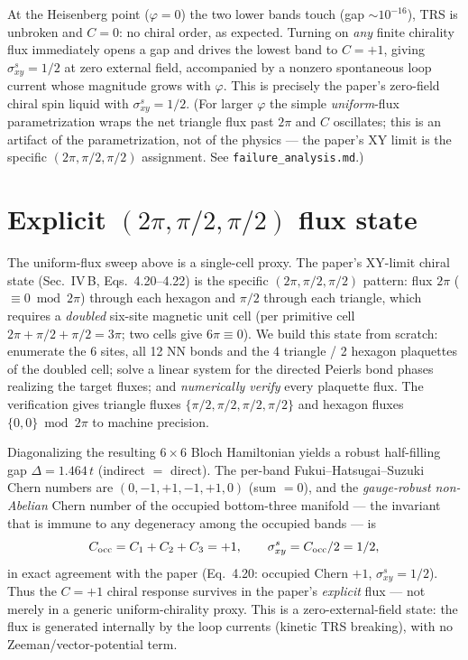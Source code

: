 \documentclass[aps,prb,twocolumn,superscriptaddress,nofootinbib]{revtex4-2}
\begin{document}
At the Heisenberg point ($\varphi=0$) the two lower bands touch (gap
$\sim10^{-16}$), TRS is unbroken and $C=0$: no chiral order, as expected.
Turning on \emph{any} finite chirality flux immediately opens a gap and drives
the lowest band to $C=+1$, giving $\sigma^s_{xy}=1/2$ at zero external field,
accompanied by a nonzero spontaneous loop current whose magnitude grows with
$\varphi$. This is precisely the paper's zero-field chiral spin liquid with
$\sigma^s_{xy}=1/2$. (For larger $\varphi$ the simple \emph{uniform}-flux
parametrization wraps the net triangle flux past $2\pi$ and $C$ oscillates;
this is an artifact of the parametrization, not of the physics --- the paper's
XY limit is the specific $(2\pi,\pi/2,\pi/2)$ assignment. See
\texttt{failure\_analysis.md}.)

\section{Explicit $(2\pi,\pi/2,\pi/2)$ flux state}
The uniform-flux sweep above is a single-cell proxy. The paper's XY-limit
chiral state (Sec.~IV\,B, Eqs.~4.20--4.22) is the specific
$(2\pi,\pi/2,\pi/2)$ pattern: flux $2\pi$ ($\equiv0\bmod2\pi$) through each
hexagon and $\pi/2$ through each triangle, which requires a \emph{doubled}
six-site magnetic unit cell (per primitive cell $2\pi+\pi/2+\pi/2=3\pi$; two
cells give $6\pi\equiv0$). We build this state from scratch: enumerate the 6
sites, all 12 NN bonds and the 4 triangle / 2 hexagon plaquettes of the doubled
cell; solve a linear system for the directed Peierls bond phases realizing the
target fluxes; and \emph{numerically verify} every plaquette flux. The
verification gives triangle fluxes $\{\pi/2,\pi/2,\pi/2,\pi/2\}$ and hexagon
fluxes $\{0,0\}\bmod2\pi$ to machine precision.

Diagonalizing the resulting $6\times6$ Bloch Hamiltonian yields a robust
half-filling gap $\Delta=1.464\,t$ (indirect $=$ direct). The per-band
Fukui--Hatsugai--Suzuki Chern numbers are $(0,-1,+1,-1,+1,0)$ (sum $=0$), and
the \emph{gauge-robust non-Abelian} Chern number of the occupied bottom-three
manifold --- the invariant that is immune to any degeneracy among the occupied
bands --- is
\begin{equation}
C_{\rm occ}=C_1+C_2+C_3=+1,\qquad \sigma^s_{xy}=C_{\rm occ}/2=1/2 ,
\end{equation}
in exact agreement with the paper (Eq.~4.20: occupied Chern $+1$,
$\sigma^s_{xy}=1/2$). Thus the $C=+1$ chiral response survives in the paper's
\emph{explicit} flux --- not merely in a generic uniform-chirality proxy. This
is a zero-external-field state: the flux is generated internally by the loop
currents (kinetic TRS breaking), with no Zeeman/vector-potential term.
\end{document}
